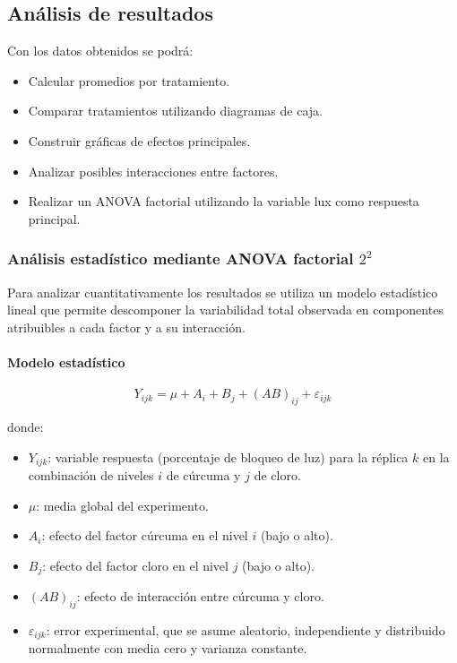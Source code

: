 \subsection{Análisis de resultados}

Con los datos obtenidos se podrá:

\begin{itemize}
\item Calcular promedios por tratamiento.
\item Comparar tratamientos utilizando diagramas de caja.
\item Construir gráficas de efectos principales.
\item Analizar posibles interacciones entre factores.
\item Realizar un ANOVA factorial utilizando la variable lux como respuesta principal.
\end{itemize}

\subsubsection{\texorpdfstring{Análisis estadístico mediante ANOVA factorial \(2^2\)}{Análisis estadístico mediante ANOVA factorial 2 por 2}}

Para analizar cuantitativamente los resultados se utiliza un modelo estadístico lineal que permite descomponer la variabilidad total observada en componentes atribuibles a cada factor y a su interacción.

\paragraph{Modelo estadístico}

\[
Y_{ijk} = \mu + A_i + B_j + (AB)_{ij} + \varepsilon_{ijk}
\]

donde:
\begin{itemize}
\item $Y_{ijk}$: variable respuesta (porcentaje de bloqueo de luz) para la réplica $k$ en la combinación de niveles $i$ de cúrcuma y $j$ de cloro.
\item $\mu$: media global del experimento.
\item $A_i$: efecto del factor cúrcuma en el nivel $i$ (bajo o alto).
\item $B_j$: efecto del factor cloro en el nivel $j$ (bajo o alto).
\item $(AB)_{ij}$: efecto de interacción entre cúrcuma y cloro.
\item $\varepsilon_{ijk}$: error experimental, que se asume aleatorio, independiente y distribuido normalmente con media cero y varianza constante.
\end{itemize}

